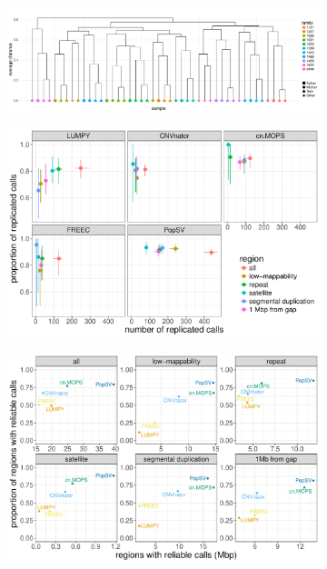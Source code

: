 \begin{figure}[htp]
  \centering
  \begin{subfigure}[b]{\textwidth}
    \includegraphics[width=\linewidth]{figures/replication-twins-long.pdf}
    \caption{}
    \label{fig:cluster}
  \end{subfigure}
  
  \begin{subfigure}[b]{.48\textwidth}
    \includegraphics[width=\linewidth, page=2]{figures/replication-twins.pdf}
    \caption{}
    \label{fig:replication}
  \end{subfigure}
  \begin{subfigure}[b]{.48\textwidth}
    \includegraphics[width=\linewidth, page=1]{figures/replication-twins-reliable.pdf}
    \caption{}
    \label{fig:reliable}
  \end{subfigure}


\end{figure}
